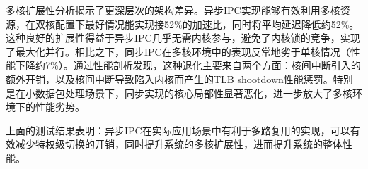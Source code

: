 多核扩展性分析揭示了更深层次的架构差异。异步IPC实现能够有效利用多核资源，在双核配置下最好情况能实现接52\%的加速比，同时将平均延迟降低约52\%。这种良好的扩展性得益于异步IPC几乎无需内核参与，避免了内核锁的竞争，实现了最大化并行。相比之下，同步IPC在多核环境中的表现反常地劣于单核情况（性能下降约7\%）。通过性能剖析发现，这种退化主要来自两个方面：核间中断引入的额外开销，以及核间中断导致陷入内核而产生的TLB shootdown性能惩罚。特别是在小数据包处理场景下，同步实现的核心局部性显著恶化，进一步放大了多核环境下的性能劣势。

上面的测试结果表明：异步IPC在实际应用场景中有利于多路复用的实现，可以有效减少特权级切换的开销，同时提升系统的多核扩展性，进而提升系统的整体性能。